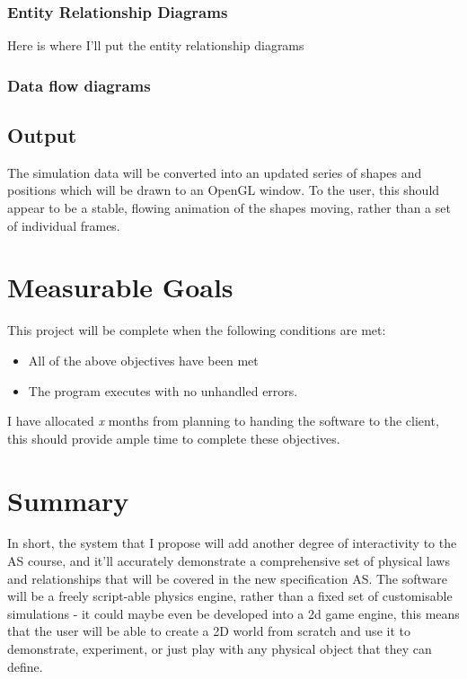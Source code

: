 \subsubsection{Entity Relationship Diagrams}
	Here is where I'll put the entity relationship diagrams

\subsubsection{Data flow diagrams}


\subsection{Output}
	The simulation data will be  converted into an updated series of shapes and positions which will be drawn to an OpenGL window. To the user, this should appear to be a stable, flowing animation of the shapes moving, rather than a set of individual frames.
	
\section{Measurable Goals}
	This project will be complete when the following conditions are met:
	\begin{itemize}
		\item All of the above objectives have been met
		\item The program executes with no unhandled errors.
	\end{itemize}
	I have allocated \textit{x} months from planning to handing the software to the client, this should provide ample time to complete these objectives.
	




\section{Summary}
In short, the system that I propose will add another degree of interactivity to the AS course, and it'll accurately demonstrate a comprehensive set of physical laws and relationships that will be covered in the new specification AS. The software will be a freely script-able physics engine, rather than a fixed set of customisable simulations - it could maybe even be developed into a 2d game engine, this means that the user will be able to create a 2D world from scratch and use it to demonstrate, experiment, or just play with any physical object that they can define.
